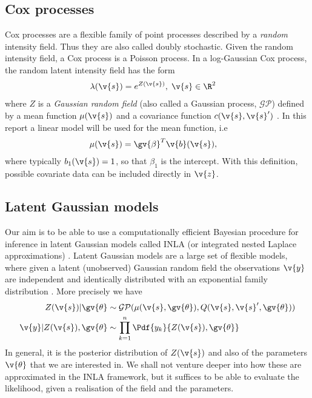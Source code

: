 \documentclass[12pt,a4paper,oneside,article]{memoir}
\begin{document}
\subsection{Cox processes}

Cox processes are a flexible family of point processes described by a 
\emph{random} intensity field. Thus they are also called doubly stochastic.
Given the random intensity field, a Cox process is a Poisson process.
In a log-Gaussian Cox process, the random latent intensity field has the form
\begin{align}
	\lambda(\v{s})&=e^{Z(\v{s})},\;\v{s}\in\R^2
	\label{eq:lambda_lgcp}
\end{align}
where $Z$ is a \emph{Gaussian random field} (also called a Gaussian process, $\mathcal{GP}$) defined by a 
mean function $\mu(\v{s})$ and a covariance function $c(\v{s},\v{s}')$ \cite{Moller2007}. 
In this report
a linear model will be used for the mean function, i.e
\begin{align}
	\mu(\v{s})&=\gv{\beta}^T\v{b}(\v{s}),
	\label{eq:lambda_mean}
\end{align}
where typically $b_1(\v{s})=1$, so that $\beta_1$ is the intercept. With this definition, possible
covariate data can be included directly in $\v{z}$. 


\subsection{Latent Gaussian models}

Our aim is to be able to use a computationally efficient Bayesian procedure for inference
in latent Gaussian models called INLA (or integrated nested Laplace approximations) \cite{Rue2009}.
Latent Gaussian models are a large set of flexible models, where given a latent (unobserved) Gaussian 
random field the observations $\v{y}$ are independent and identically distributed with
an exponential family distribution \cite{Rue2009}. 
More precisely we have
\begin{align}
	Z(\v{s})|\gv{\theta}&\sim \mathcal{GP}(\mu(\v{s},\gv{\theta}),Q(\v{s},\v{s}',\gv{\theta}))\\
	\v{y}|Z(\v{s}),\gv{\theta}&\sim \prod_{k=1}^n \Pdf{y_k}{Z(\v{s}),\gv{\theta}} \label{eq:latent_gaussian_clh}
\end{align} 
In general, it is the posterior distribution of $Z(\v{s})$ and also of the parameters $\v{\theta}$ that
we are interested in. We shall not venture deeper into how these are approximated in the INLA framework,
but it suffices to be able to evaluate the likelihood, given a realisation of the field and the parameters.
\end{document}
